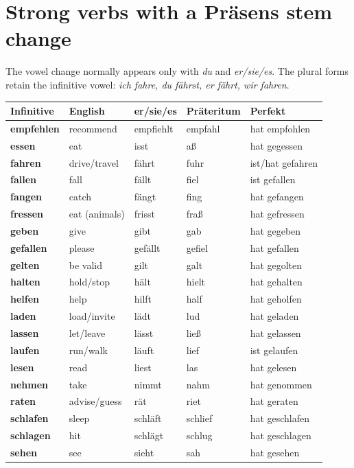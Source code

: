 \section{Strong verbs with a Präsens stem change}

The vowel change normally appears only with \textit{du} and
\textit{er/sie/es}. The plural forms retain the infinitive vowel:
\textit{ich fahre, du fährst, er fährt, wir fahren}.

\begin{center}
\small
{}
\begin{tabularx}{\textwidth}{@{}>{\bfseries}l l l l X@{}}
\toprule
Infinitive & English & er/sie/es & Präteritum & Perfekt \\
\midrule
empfehlen & recommend & empfiehlt & empfahl & hat empfohlen \\
essen & eat & isst & aß & hat gegessen \\
fahren & drive/travel & fährt & fuhr & ist/hat gefahren \\
fallen & fall & fällt & fiel & ist gefallen \\
fangen & catch & fängt & fing & hat gefangen \\
fressen & eat (animals) & frisst & fraß & hat gefressen \\
geben & give & gibt & gab & hat gegeben \\
gefallen & please & gefällt & gefiel & hat gefallen \\
gelten & be valid & gilt & galt & hat gegolten \\
halten & hold/stop & hält & hielt & hat gehalten \\
helfen & help & hilft & half & hat geholfen \\
laden & load/invite & lädt & lud & hat geladen \\
lassen & let/leave & lässt & ließ & hat gelassen \\
laufen & run/walk & läuft & lief & ist gelaufen \\
lesen & read & liest & las & hat gelesen \\
nehmen & take & nimmt & nahm & hat genommen \\
raten & advise/guess & rät & riet & hat geraten \\
schlafen & sleep & schläft & schlief & hat geschlafen \\
schlagen & hit & schlägt & schlug & hat geschlagen \\
sehen & see & sieht & sah & hat gesehen \\

\end{tabularx}
\end{center}
